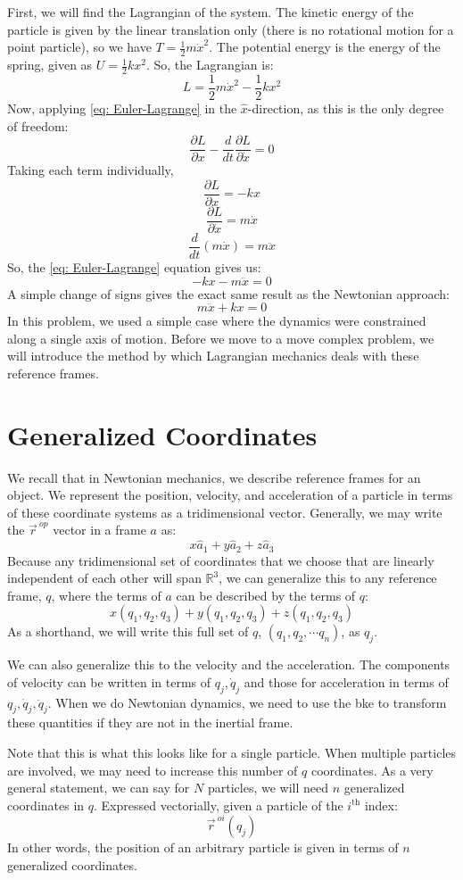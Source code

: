 \documentclass[12pt]{report}
\begin{document}
First, we will find the \gls{Lagrangian} of the system. The kinetic energy of the particle is given by the linear translation only (there is no rotational motion for a point particle), so we have $T=\frac{1}{2}m\dot{x}^2$. The potential energy is the energy of the spring, given as $U=\frac{1}{2}kx^2$. So, the \gls{Lagrangian} is:
$$L=\frac{1}{2}m\dot{x}^2-\frac{1}{2}kx^2$$
Now, applying \eqref{eq: Euler-Lagrange} in the $\hat{x}$-direction, as this is the only degree of freedom:
$$\frac{\partial L}{\partial x}-\frac{d}{dt}\frac{\partial L}{\partial \dot{x}}=0$$
Taking each term individually,
$$\frac{\partial L}{\partial x}=-kx$$
$$\frac{\partial L}{\partial \dot{x}}=m\dot{x}$$
$$\frac{d}{dt}\left(m\dot{x}\right)=m\ddot{x}$$
So, the \eqref{eq: Euler-Lagrange} equation gives us:
$$-kx-m\ddot{x}=0$$
A simple change of signs gives the exact same result as the Newtonian approach:
$$m\ddot{x}+kx=0$$
In this problem, we used a simple case where the dynamics were constrained along a single axis of motion. Before we move to a move complex problem, we will introduce the method by which \gls{Lagrangian} mechanics deals with these reference frames.
\section{Generalized Coordinates}
We recall that in Newtonian mechanics, we describe reference frames for an object. We represent the position, velocity, and acceleration of a particle in terms of these coordinate systems as a tridimensional vector. 
Generally, we may write the $\vec{r}^{\ op}$  vector in a frame $a$ as:
$$x\hat{a}_1+y\hat{a}_2+z\hat{a}_3$$
Because any tridimensional set of coordinates that we choose that are linearly independent of each other will span $\mathbb{R}^3$, we can generalize this to any reference frame, $q$, where the terms of $a$ can be described by the terms of $q$:
$$x\left(q_1,q_2,q_3\right)+y\left(q_1,q_2,q_3\right)+z\left(q_1,q_2,q_3\right)$$
As a shorthand, we will write this full set of $q$, $\left(q_1,q_2,\cdots q_n\right)$, as $q_j$.

We can also generalize this to the velocity and the acceleration. The components of velocity can be written in terms of $q_j, \dot{q}_j$ and those for acceleration in terms of $q_j, \dot{q}_j, \ddot{q}_j$.  When we do Newtonian dynamics, we need to use the \gls{bke} to transform these quantities if they are not in the inertial frame.

Note that this is what this looks like for a single particle. When multiple particles are involved, we may need to increase this number of $q$ coordinates. As a very general statement, we can say for $N$ particles, we will need $n$ generalized coordinates in $q$. Expressed vectorially, given a particle of the $i^{\mathrm{th}}$ index:
$$\vec{r}^{\ oi}(q_j)$$
In other words, the position of an arbitrary particle is given in terms of $n$ generalized coordinates. 
\end{document}
